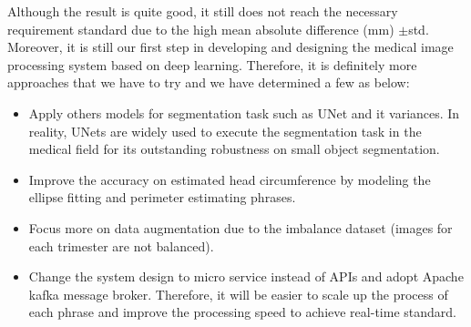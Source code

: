 	Although the result is quite good, it still does not reach the necessary requirement standard due to the high mean absolute difference (mm) $\pm$std. Moreover, it is still our first step in developing and designing the medical image processing system based on deep learning. Therefore, it is definitely more approaches that we have to try and we have determined a few as below:
	
	\begin{itemize}
		\item Apply others models for segmentation task such as UNet and it variances. In reality, UNets are widely used to execute the segmentation task in the medical field for its outstanding robustness on small object segmentation.
		
		\item Improve the accuracy on estimated head circumference by modeling the ellipse fitting and perimeter estimating phrases.
		
		\item Focus more on data augmentation due to the imbalance dataset (images for each trimester are not balanced).
		
		\item Change the system design to micro service instead of APIs and adopt Apache kafka message broker. Therefore, it will be easier to scale up the process of each phrase and improve the processing speed to achieve real-time standard.
	\end{itemize}
	
